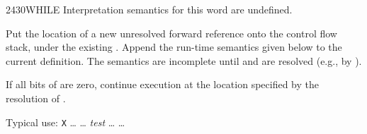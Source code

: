 \begin{worddef}{2430}{WHILE}
\interpret
	Interpretation semantics for this word are undefined.

\compile

	Put the location of a new unresolved forward reference
	 onto the control flow stack, under the existing
	. Append the run-time semantics given below to the
	current definition. The semantics are incomplete until
	 and  are resolved (e.g., by
	).

\runtime

	If all bits of  are zero, continue execution at the
	location specified by the resolution of .

	\begin{rationale} %
		Typical use:
			\word{:} \texttt{X} {\ldots}
				 {\ldots}
				\emph{test} 
				{\ldots} 
			{\ldots} \word{;}
	\end{rationale}

	\begin{testing} %
		 \\
		 \\
		 \\
		 \\

		 \\
		 \\
		 \\
		 \\
		 \\
	\end{testing}
\end{worddef}


